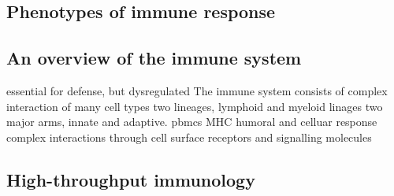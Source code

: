\begin{outline}

\section{Phenotypes of immune response}

\subsection{An overview of the immune system}

\1 essential for defense, but dysregulated
    \2 The immune system consists of complex interaction of many cell types
    \2 two lineages, lymphoid and myeloid linages
    \2 two major arms, innate and adaptive.
        \3 pbmcs
        \3 MHC
        \3 humoral and celluar response
    \2 complex interactions through cell surface receptors and signalling molecules

\subsection{High-throughput immunology}


\end{outline}
